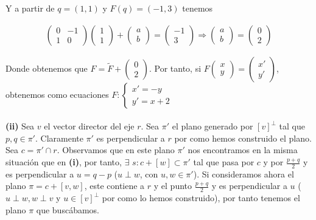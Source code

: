 Y a partir de $q=(1,1)$ y $F(q) = (-1,3)$ tenemos

\begin{gather*}
    \begin{pmatrix}
    0 & -1\\
    1 & 0
    \end{pmatrix}
    \begin{pmatrix}
    1\\
    1 
    \end{pmatrix}
    +
    \begin{pmatrix}
    a\\
    b
    \end{pmatrix}
    =
    \begin{pmatrix}
    -1\\
    3
    \end{pmatrix}
    \Longrightarrow
    \begin{pmatrix}
    a\\b
    \end{pmatrix}
    =
    \begin{pmatrix}
    0\\2
    \end{pmatrix}
\end{gather*}

Donde obtenemos que $F = \widetilde{F} + \begin{pmatrix} 0\\2 \end{pmatrix}$. Por tanto, si $F \begin{pmatrix} x\\y \end{pmatrix} = \begin{pmatrix} x'\\y' \end{pmatrix}$, obtenemos como ecuaciones $F: \begin{cases}x' = -y\\ y' = x + 2 \end{cases}$  
\\
\\

\hspace*{10mm} \textbf{(ii)} Sea $v$ el vector director del eje $r$. Sea $\pi'$ el plano generado por $[v]^\perp$ tal que $p,q \in \pi'$. Claramente $\pi'$ es perpendicular a $r$ por como hemos construido el plano. Sea $c = \pi' \cap r$. Observamos que en este plano $\pi'$ nos encontramos en la misma situación que en \textbf{(i)}, por tanto, $\exists$ $s: c + [w] \subset \pi'$ tal que pasa por $c$ y por $\frac{p+q}{2}$ y es perpendicular a $u= q-p$ ($u \perp w$, con $u,w \in \pi'$). Si consideramos ahora el plano $\pi = c + [v,w]$, este contiene a $r$ y el punto $\frac{p+q}{2}$ y es perpendicular a $u$ ($u \perp w, w \perp v$ y $u \in [v]^{\perp}$ por como lo hemos construido), por tanto tenemos el plano $\pi$ que buscábamos.

